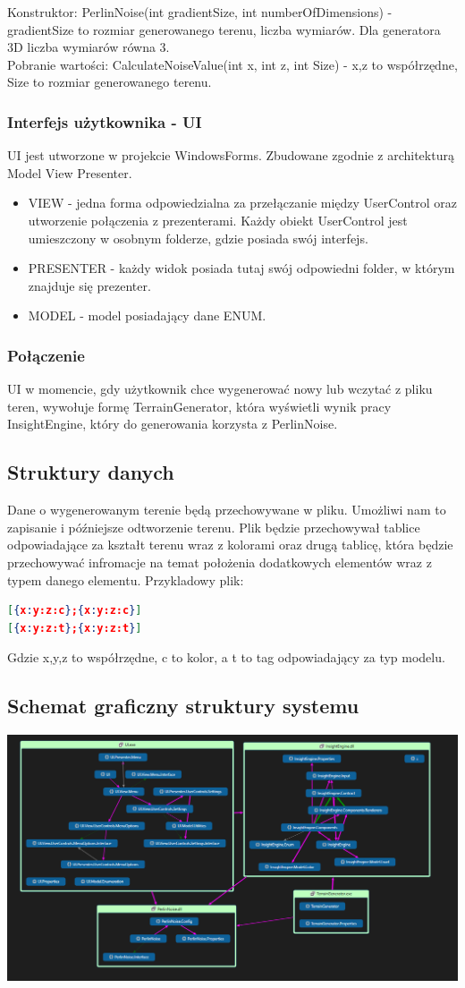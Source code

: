 \documentclass[12pt,a4paper]{article}
\begin{document}
Konstruktor: PerlinNoise(int gradientSize, int numberOfDimensions) - gradientSize to rozmiar generowanego terenu, liczba wymiarów. Dla generatora 3D liczba wymiarów równa 3.\\
Pobranie wartości: CalculateNoiseValue(int x, int z, int Size) - x,z to współrzędne, Size to rozmiar generowanego terenu.
\subsubsection{Interfejs użytkownika - UI}
UI jest utworzone w projekcie WindowsForms. Zbudowane zgodnie z architekturą Model View Presenter. \begin{itemize}
\item VIEW - jedna forma odpowiedzialna za przełączanie między UserControl oraz utworzenie połączenia z prezenterami. Każdy obiekt UserControl jest umieszczony w osobnym folderze, gdzie posiada swój interfejs.
\item PRESENTER - każdy widok posiada tutaj swój odpowiedni folder, w którym znajduje się prezenter.
\item MODEL - model posiadający dane ENUM.
\end{itemize}
\subsubsection{Połączenie}
UI w momencie, gdy użytkownik chce wygenerować nowy lub wczytać z pliku teren, wywołuje formę TerrainGenerator, która wyświetli wynik pracy InsightEngine, który do generowania korzysta z PerlinNoise.
\subsection{Struktury danych}
Dane o wygenerowanym terenie będą przechowywane w pliku. Umożliwi nam to zapisanie i późniejsze odtworzenie terenu. Plik będzie przechowywał tablice odpowiadające za kształt terenu wraz z kolorami oraz drugą tablicę, która będzie przechowywać infromacje na temat położenia dodatkowych elementów wraz z typem danego elementu. Przykladowy plik:
\begin{lstlisting}[language=json,firstnumber=1]
[{x:y:z:c};{x:y:z:c}]
[{x:y:z:t};{x:y:z:t}]
\end{lstlisting}
Gdzie x,y,z to współrzędne, c to kolor, a t to tag odpowiadający za typ modelu.
\subsection{Schemat graficzny struktury systemu}
\includegraphics[width=1\textwidth]{images/klasyFinall.png}
\end{document}
